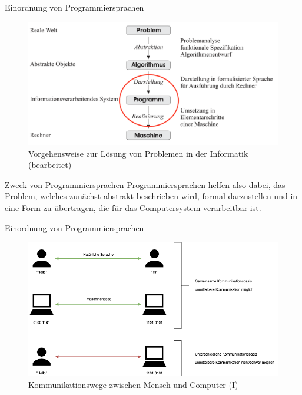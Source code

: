    \begin{frame}{Einordnung von Programmiersprachen}
        \begin{figure}
            \centering
            \includegraphics[width=\linewidth,height=0.5\textheight,keepaspectratio]{chapters/04_programming_languages/figures/problem2solution_marked.png}
            \caption{Vorgehensweise zur Lösung von Problemen in der Informatik \cite{Muller2015} (bearbeitet)}
        \end{figure}
    \end{frame}
    
    \begin{frame}{Zweck von Programmiersprachen}
        Programmiersprachen helfen also dabei, das Problem, welches zunächst abstrakt beschrieben wird, formal darzustellen und in eine Form zu übertragen, die für das Computersystem verarbeitbar ist.
    \end{frame}
    
    \begin{frame}{Einordnung von Programmiersprachen}
        \begin{figure}
            \centering
            \includegraphics[width=\linewidth,height=0.5\textheight,keepaspectratio]{chapters/04_programming_languages/figures/communication_direct.png}
            \caption{Kommunikationswege zwischen Mensch und Computer (I)}
        \end{figure}
    \end{frame}
    

